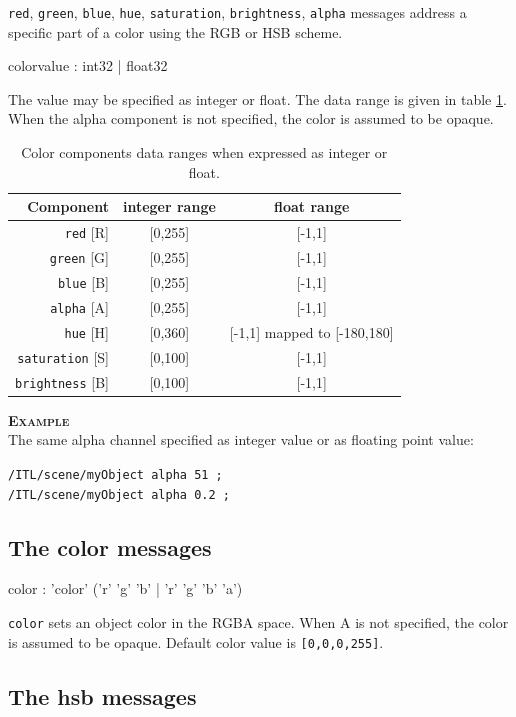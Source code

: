 \documentclass[a4paper,twoside]{report}
\newcommand{\subsublevel}[1]	{\subsection{#1}}
\newcommand{\OSC}[1]		{\texttt{#1}}
\newcommand{\values}[1]		{\texttt{#1}}
\newcommand{\example}		{\textbf{\hspace{-1.5cm}\textbf{\textsc{Example }}}}
\newcommand{\sample}	[1]			{\vspace{-2mm}\begin{center}\colorbox{mygrey}{
								\begin{minipage}[t]{0.9\columnwidth} 
								{\small \texttt{#1}}
								\end{minipage}}\end{center}}
\begin{document}
\OSC{red}, \OSC{green}, \OSC{blue}, \OSC{hue}, \OSC{saturation}, \OSC{brightness}, \OSC{alpha} messages address a specific part of a color using the RGB or HSB scheme.

\begin{rail}
colorvalue :    int32 | float32
\end{rail}

The value may be specified as integer or float. The data range is given in table \ref{colorrange}.
When the alpha component is not specified, the color is assumed to be opaque. 

\begin{table}[htdp]
\begin{center}
\begin{tabular}{|r|c|c|}
\hline
Component & integer range & float range \\
\hline
\OSC{red} [R] 		& [0,255] & [-1,1] \\
\OSC{green} [G] 	& [0,255] & [-1,1] \\
\OSC{blue} [B]		& [0,255] & [-1,1] \\
\OSC{alpha} [A] 	& [0,255] & [-1,1] \\
\OSC{hue} [H] 		& [0,360] & [-1,1] mapped to [-180,180]\\
\OSC{saturation} [S] 	& [0,100] & [-1,1] \\
\OSC{brightness} [B] 	& [0,100] & [-1,1] \\
\hline
\end{tabular}
\end{center}
\caption{Color components data ranges when expressed as integer or float.}
\label{colorrange}
\end{table}%


\example \\
The same alpha channel specified as integer value or as floating point value:
\sample{/ITL/scene/myObject alpha 51 ;\\
/ITL/scene/myObject alpha 0.2 ;
}

\subsublevel{The color messages}

\begin{rail}
color :		'color' ('r' 'g' 'b' | 'r' 'g' 'b' 'a') 
\end{rail}

\OSC{color} sets an object color in the RGBA space.
When A is not specified, the color is assumed to be opaque. 
Default color value is \values{[0,0,0,255]}.


\subsublevel{The hsb messages}
\end{document}
